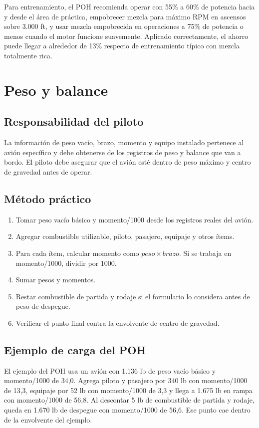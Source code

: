 \documentclass[11pt,oneside]{book}
\begin{document}
Para entrenamiento, el POH recomienda operar con 55\% a 60\% de potencia hacia y desde el área de práctica, empobrecer mezcla para máximo RPM en ascensos sobre 3.000 ft, y usar mezcla empobrecida en operaciones a 75\% de potencia o menos cuando el motor funcione suavemente. Aplicado correctamente, el ahorro puede llegar a alrededor de 13\% respecto de entrenamiento típico con mezcla totalmente rica.

\chapter{Peso y balance}

\section{Responsabilidad del piloto}

La información de peso vacío, brazo, momento y equipo instalado pertenece al avión específico y debe obtenerse de los registros de peso y balance que van a bordo. El piloto debe asegurar que el avión esté dentro de peso máximo y centro de gravedad antes de operar.

\section{Método práctico}

\begin{enumerate}
\item Tomar peso vacío básico y momento/1000 desde los registros reales del avión.
\item Agregar combustible utilizable, piloto, pasajero, equipaje y otros ítems.
\item Para cada ítem, calcular momento como \(peso \times brazo\). Si se trabaja en momento/1000, dividir por 1000.
\item Sumar pesos y momentos.
\item Restar combustible de partida y rodaje si el formulario lo considera antes de peso de despegue.
\item Verificar el punto final contra la envolvente de centro de gravedad.
\end{enumerate}

\section{Ejemplo de carga del POH}

El ejemplo del POH usa un avión con 1.136 lb de peso vacío básico y momento/1000 de 34,0. Agrega piloto y pasajero por 340 lb con momento/1000 de 13,3, equipaje por 52 lb con momento/1000 de 3,3 y llega a 1.675 lb en rampa con momento/1000 de 56,8. Al descontar 5 lb de combustible de partida y rodaje, queda en 1.670 lb de despegue con momento/1000 de 56,6. Ese punto cae dentro de la envolvente del ejemplo.
\end{document}
